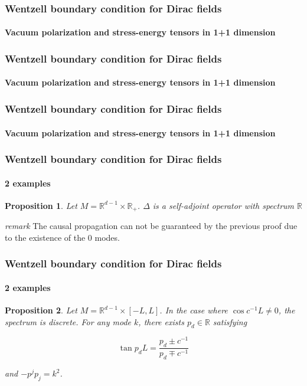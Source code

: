 \documentclass[french]{beamer}
\newtheorem{proposition}{Proposition}
\begin{document}
\begin{frame}
\frametitle{Wentzell boundary condition for Dirac fields}
\framesubtitle{Vacuum polarization and stress-energy tensors in 1+1 dimension}



\end{frame}
\begin{frame}
\frametitle{Wentzell boundary condition for Dirac fields}
\framesubtitle{Vacuum polarization and stress-energy tensors in 1+1 dimension}



\end{frame}
\begin{frame}
\frametitle{Wentzell boundary condition for Dirac fields}
\framesubtitle{Vacuum polarization and stress-energy tensors in 1+1 dimension}



\end{frame}
\begin{frame}
\frametitle{Wentzell boundary condition for Dirac fields}
\framesubtitle{2 examples}

\begin{proposition}
Let $M = \mathbb{R}^{d-1} \times \mathbb{R}_+$. $\Delta$ is a self-adjoint operator with spectrum $\mathbb{R}$
\end{proposition}

\textit{remark}
The causal propagation can not be guaranteed by the previous proof due to the existence of the 0 modes.


\end{frame}

\begin{frame}
\frametitle{Wentzell boundary condition for Dirac fields}
\framesubtitle{2 examples}

\begin{proposition}
Let ${M} = \mathbb{R}^{d-1} \times [-L, L]$.
In the case where $\cos c^{-1}L \neq 0$,
the spectrum is discrete.
For any mode $k$, there exists $p_d\in \mathbb{R}$ 
satisfying 

\begin{equation*}
\tan p_d L = \frac{p_d \pm c^{-1}}{p_d \mp c^{-1}}
\end{equation*}

and $-p^jp_j = k^2$.
\end{proposition}


\end{frame}
\end{document}
